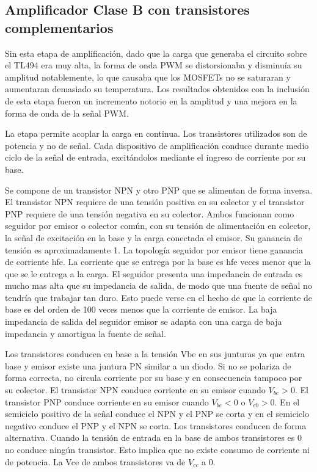 \subsection{Amplificador Clase B con transistores complementarios}

Sin esta etapa de amplificación, dado que la carga que generaba el circuito sobre el TL494 era muy alta, 
la forma de onda PWM se distorsionaba y disminuía su amplitud notablemente, lo que causaba que los MOSFETs no se saturaran y aumentaran demasiado su temperatura.
Los resultados obtenidos con la inclusión de esta etapa fueron un incremento notorio en la amplitud y una mejora en la forma de onda de la señal PWM.

La etapa permite acoplar la carga en continua. 
Los transistores utilizados son de potencia y no de señal. 
Cada dispositivo de amplificación conduce durante medio ciclo de la señal de entrada, 
excitándolos mediante el ingreso de corriente por su base.

Se compone de un transistor NPN y otro PNP que se alimentan de forma inversa.
El transistor NPN requiere de una tensión positiva en su colector y 
el transistor PNP requiere de una tensión negativa en su colector.
Ambos funcionan como seguidor por emisor o colector común, con su tensión de alimentación en colector, la señal de excitación en la base y la carga conectada el emisor. 
Su ganancia de tensión es aproximadamente 1. 
La topología seguidor por emisor tiene ganancia de corriente hfe. 
La corriente que se entrega por la base es hfe veces menor que la que se le entrega a la carga. 
El seguidor presenta una impedancia de entrada es mucho mas alta que su impedancia de salida, de modo que una fuente de señal no tendría que trabajar tan duro.
 Esto puede verse en el hecho de que la corriente de base es del orden de 100 veces menos que la corriente de emisor. 
 La baja impedancia de salida del seguidor emisor se adapta con una carga de baja impedancia y amortigua la fuente de señal.

Los transistores conducen en base a la tensión Vbe en sus junturas ya que entra base y emisor existe una juntura PN similar a un diodo. 
Si no se polariza de forma correcta, no circula corriente por su base y en consecuencia tampoco por su colector. 
El transistor NPN conduce corriente en su emisor cuando $V_{be}>0$. 
El transistor PNP conduce corriente en su emisor cuando $V_{be}<0$ o $V_{eb}>0$.
En el semiciclo positivo de la señal conduce el NPN y el PNP se corta y en el semiciclo negativo conduce el PNP y el NPN se corta. 
Los transistores conducen de forma alternativa. 
Cuando la tensión de entrada en la base de ambos transistores es 0 no conduce ningún transistor. 
Esto implica que no existe consumo de corriente ni de potencia. 
La Vce de ambos transistores va de $V_{cc}$ a 0.


